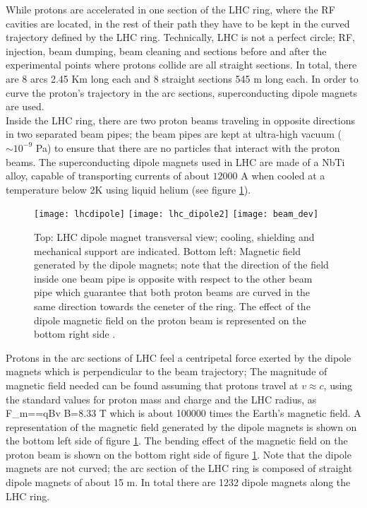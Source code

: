 \noindent While protons are accelerated in one section of the LHC ring, where the RF cavities are located, in the rest of their path they have to be kept in the curved trajectory defined by the LHC ring. Technically, LHC is not a perfect circle; RF, injection, beam dumping, beam cleaning and sections before and after the experimental points where protons collide are all straight sections. In total, there are 8 arcs 2.45 Km long each and 8 straight sections 545 m long each. In order to curve the proton's trajectory in the arc sections, superconducting dipole magnets are used.\\               

\noindent Inside the LHC ring, there are two proton beams traveling in opposite directions in two separated beam pipes; the beam pipes are kept at ultra-high vacuum ($\sim 10^{-9}$ Pa) to ensure that there are no particles that interact with the proton beams. The superconducting dipole magnets used in LHC are made of a NbTi alloy, capable of transporting currents of about $12000$ A when cooled at a temperature below 2K using liquid helium (see figure \ref{fig:lhcdipole}).\\

\begin{figure}[!h]
\centering
\texttt{[image: lhcdipole]}
\texttt{[image: lhc\_dipole2]}
\texttt{[image: beam\_dev]}
\caption [LHC dipole magnet.]{Top: LHC dipole magnet transversal view; cooling, shielding and mechanical support are indicated. Bottom left: Magnetic field generated by the dipole magnets; note that the direction of the field inside one beam pipe is opposite with respect to the other beam pipe which guarantee that both proton beams are curved in the same direction towards the ceneter of the ring. The effect of the dipole magnetic field on the proton beam is represented on the bottom right side \cite{lhc_dipole, dipole_field,video}.}\label{fig:lhcdipole}
\end{figure}

\noindent Protons in the arc sections of LHC feel a centripetal force exerted by the dipole magnets which is perpendicular to the beam trajectory; The magnitude of magnetic field needed can be found assuming that protons travel at $v \approx c$, using the standard values for proton mass and charge and the LHC radius, as
\beqn
F_m==qBv \quad \to B=8.33 T
\eeqn
\noindent which is about 100000 times the Earth's magnetic field. A representation of the magnetic field generated by the dipole magnets is shown on the bottom left side of figure \ref{fig:lhcdipole}. The bending effect of the magnetic field on the proton beam is shown on the bottom right side of figure \ref{fig:lhcdipole}. Note that the dipole magnets are not curved; the arc section of the LHC ring is composed of straight dipole magnets of about 15 m. In total there are 1232 dipole magnets along the LHC ring.\\

